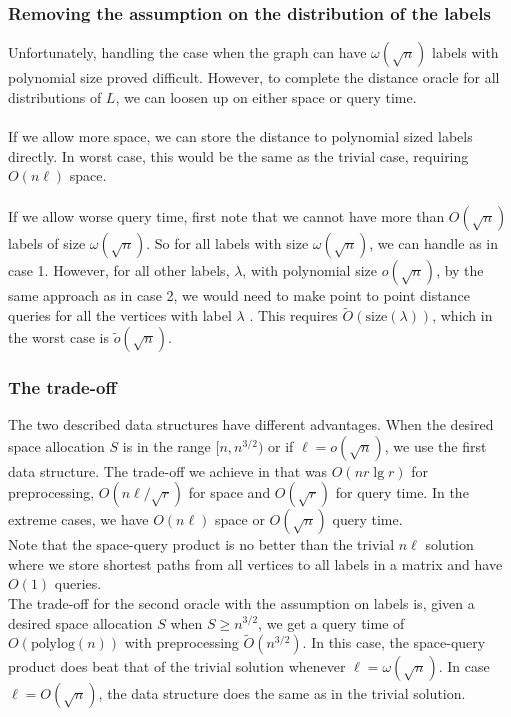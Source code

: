 \subsubsection{Removing the assumption on the distribution of the labels}
Unfortunately, handling the case when the graph can have $\omega(\sqrt{n})$ labels with
polynomial size proved difficult. However, to complete the distance oracle for all
distributions of $L$, we can loosen up on either space or query time. \\
\\
If we allow more space, we can store the distance to polynomial sized labels directly. In
worst case, this would be the same as the trivial case, requiring $O(n\ell)$ space. \\
\\
If we allow worse query time, first note that we cannot have more than $O(\sqrt{n})$
labels of size $\omega(\sqrt{n})$. So for all labels with size $\omega(\sqrt{n})$, we can
handle as in case 1. However, for all other labels, $\lambda$, with polynomial size $o(\sqrt{n})$, by the same
approach as in case 2, we would need to make point to point distance queries for all the
vertices with label $\lambda$ . This requires $\tilde{O}(\text{size}(\lambda))$, which in
the worst case is $\tilde{o}(\sqrt{n})$.

\subsubsection{The trade-off}\label{exactoracletrade}
The two described data structures have different advantages. When the desired space
allocation $S$ is in the range $[n,n^{3/2})$ or if $\ell=o(\sqrt{n})$, we use the first
  data structure. The trade-off we achieve in that was $O(nr\lg r)$ for preprocessing,
  $O(n\ell/\sqrt{r})$ for space and $O(\sqrt{r})$ for query time. In
  the extreme cases, we have $O(n\ell)$ space or $O(\sqrt{n})$ query time.  \\
Note that the space-query product is no better than the trivial $n\ell$ solution where we
store shortest paths from all vertices to all labels in a matrix and have $O(1)$ queries. \\
The trade-off for the second oracle with the
assumption on labels is, given a desired space allocation $S$ when $S\geq n^{3/2}$, we get a
query time of $O(\text{polylog}(n))$ with preprocessing $\tilde{O}(n^{3/2})$. In this
case, the space-query product does beat that of the trivial solution whenever
$\ell=\omega(\sqrt{n})$. In case $\ell=O(\sqrt{n})$, the data structure does the same as
in the trivial solution.
